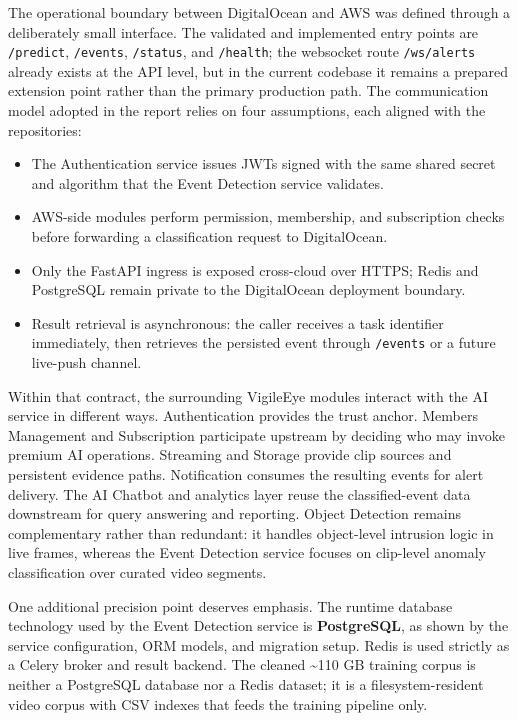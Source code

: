 \documentclass[12pt,a4paper,oneside]{report}
\begin{document}
\hspace{0.8cm}The operational boundary between DigitalOcean and AWS was defined through a deliberately small interface. The validated and implemented entry points are \texttt{/predict}, \texttt{/events}, \texttt{/status}, and \texttt{/health}; the websocket route \texttt{/ws/alerts} already exists at the API level, but in the current codebase it remains a prepared extension point rather than the primary production path. The communication model adopted in the report relies on four assumptions, each aligned with the repositories:
\begin{itemize}
  \item The Authentication service issues JWTs signed with the same shared secret and algorithm that the Event Detection service validates.
  \item AWS-side modules perform permission, membership, and subscription checks before forwarding a classification request to DigitalOcean.
  \item Only the FastAPI ingress is exposed cross-cloud over HTTPS; Redis and PostgreSQL remain private to the DigitalOcean deployment boundary.
  \item Result retrieval is asynchronous: the caller receives a task identifier immediately, then retrieves the persisted event through \texttt{/events} or a future live-push channel.
\end{itemize}

\hspace{0.8cm}Within that contract, the surrounding VigileEye modules interact with the AI service in different ways. Authentication provides the trust anchor. Members Management and Subscription participate upstream by deciding who may invoke premium AI operations. Streaming and Storage provide clip sources and persistent evidence paths. Notification consumes the resulting events for alert delivery. The AI Chatbot and analytics layer reuse the classified-event data downstream for query answering and reporting. Object Detection remains complementary rather than redundant: it handles object-level intrusion logic in live frames, whereas the Event Detection service focuses on clip-level anomaly classification over curated video segments.

\hspace{0.8cm}One additional precision point deserves emphasis. The runtime database technology used by the Event Detection service is \textbf{PostgreSQL}, as shown by the service configuration, ORM models, and migration setup. Redis is used strictly as a Celery broker and result backend. The cleaned \textasciitilde110 GB training corpus is neither a PostgreSQL database nor a Redis dataset; it is a filesystem-resident video corpus with CSV indexes that feeds the training pipeline only.
\end{document}
